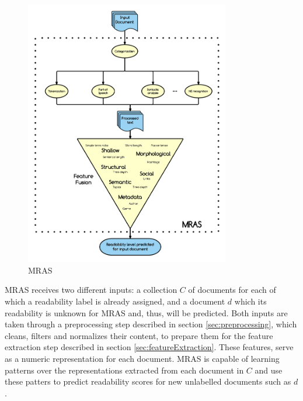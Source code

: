\documentclass{bsu-ms}
\newcommand{\projectName}{MRAS\xspace}
\begin{document}
\begin{figure}[h!]
\centering
\includegraphics[width=0.8\textwidth]{pipelineGraph}
\caption{\projectName}
\label{fig:pipeline}
\end{figure}



\projectName receives two different inputs: a collection $C$ of documents for each of which a readability label is already assigned, and a document $d$ which its readability is unknown for \projectName and, thus, will be predicted. Both inputs are taken through a preprocessing step described in section \ref{sec:preprocessing}, which cleans, filters and normalizes their content, to prepare them for the feature extraction step described in section \ref{sec:featureExtraction}. These features, serve as a numeric representation for each document. \projectName is capable of learning patterns over the representations extracted from each document in $C$ and use these patters to predict readability scores for new unlabelled documents such as $d$.
\end{document}
